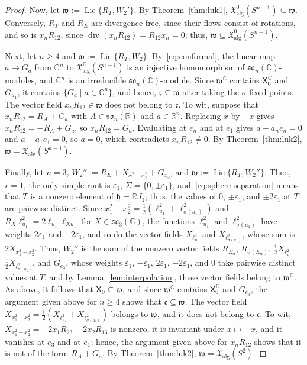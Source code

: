 \documentclass{article}
\newcommand{\R}{\mathbb{R}}
\newcommand{\C}{\mathbb{C}}
\newcommand{\frakh}{\mathfrak{h}}
\newcommand{\frakw}{\mathfrak{w}}
\newcommand{\frakc}{\mathfrak{c}}
\newcommand{\xalg}{\mathfrak X_{\mathrm{alg}}}
\newcommand{\xalgz}{\mathfrak X^{0}_{\mathrm{alg}}}
\newcommand{\sX}{\mathsf{X}}
\theoremstyle{definition}
\theoremstyle{plain}
\begin{document}
\begin{proof}
Now, let $\frakw:=\operatorname{Lie}\{R_T,W_2'\}$.
By Theorem~\ref{thm:luk1}, $\xalgz(S^{n-1})\subseteq\frakw$.
Conversely, $R_T$ and $R_E$ are divergence-free, since their flows consist of rotations, and so is $x_nR_{12}$, since $\operatorname{div}(x_nR_{12})=R_{12}x_n=0$; thus, $\frakw\subseteq\xalgz(S^{n-1})$.

Next, let $n\geq4$ and $\frakw:=\operatorname{Lie}\{R_T,W_2\}$.
By~\eqref{eq:conformal}, the linear map $a\mapsto G_a$ from $\C^n$ to $\xalg^\C(S^{n-1})$ is an injective homomorphism of $\mathfrak{so}_n(\C)$-modules, and $\C^n$ is an irreducible $\mathfrak{so}_n(\C)$-module. Since $\frakw^\C$ contains $\sX_0^\C$ and $G_{u_1}$, it contains $\{G_a\mid a\in\C^n\}$, and hence, $\frakc\subseteq\frakw$ after taking the $\sigma$-fixed points.
The vector field $x_nR_{12}\in\frakw$ does not belong to $\frakc$.
To wit, suppose that $x_nR_{12}=R_A+G_a$ with $A\in\mathfrak{so}_n(\R)$ and $a\in\R^n$.  Replacing $x$ by $-x$ gives $x_nR_{12}=-R_A+G_a$, so $x_nR_{12}=G_a$. Evaluating at $e_n$ and at $e_1$ gives $a-a_ne_n=0$ and $a-a_1e_1=0$, so $a=0$, which contradicts $x_nR_{12}\neq0$.
By Theorem~\ref{thm:luk2}, $\frakw=\xalg(S^{n-1})$.

Finally, let $n=3$, $W_2'':=R_E+X_{x_1^2-x_2^2}+G_{x_3}$, and $\frakw:=\operatorname{Lie}\{R_T,W_2''\}$.
Then, $r=1$, the only simple root is $\varepsilon_1$, $\Sigma=\{0,\pm\varepsilon_1\}$, and~\eqref{eq:sphere-separation} means that $T$ is a nonzero element of $\frakh=\R J_1$; thus, the values of $0$,
  $\pm\varepsilon_1$, and $\pm2\varepsilon_1$ at $T$ are pairwise distinct.
Since $x_1^2-x_2^2=\frac12(\ell_{u_1}^2+\ell_{\sigma(u_1)}^2)$ and $R_X\ell_{u_1}^2=2\ell_{u_1}\ell_{Xu_1}$ for $X\in\mathfrak{so}_3(\C)$, the functions $\ell_{u_1}^2$ and $\ell_{\sigma(u_1)}^2$ have weights $2\varepsilon_1$ and $-2\varepsilon_1$,
    and so do the vector fields $X_{\ell_{u_1}^2}$ and $X_{\ell_{\sigma(u_1)}^2}$, whose sum is $2X_{x_1^2-x_2^2}$.
Thus, $W_2''$ is the sum of the nonzero vector fields $R_{E_\alpha}$, $R_{\sigma(E_\alpha)}$, $\frac12X_{\ell_{u_1}^2}$, $\frac12X_{\ell_{\sigma(u_1)}^2}$, and $G_{e_3}$, whose weights $\varepsilon_1$, $-\varepsilon_1$, $2\varepsilon_1$, $-2\varepsilon_1$, and $0$ take pairwise distinct values at $T$, and by Lemma~\ref{lem:interpolation}, these vector fields belong to $\frakw^\C$.
As above, it follows that $\sX_0\subseteq\frakw$, and since $\frakw^\C$ contains $\sX_0^\C$ and $G_{e_3}$, the argument given above for $n\geq4$ shows that $\frakc\subseteq\frakw$.
The vector field $X_{x_1^2-x_2^2}=\frac12(X_{\ell_{u_1}^2}+X_{\ell_{\sigma(u_1)}^2})$ belongs to $\frakw$, and it does not belong to $\frakc$.
To wit, $X_{x_1^2-x_2^2}=-2x_1R_{23}-2x_2R_{13}$ is nonzero, it is invariant under $x\mapsto-x$, and it vanishes at $e_3$ and at $e_1$; hence, the argument given above for $x_nR_{12}$ shows that it is not of the form $R_A+G_a$.
By Theorem~\ref{thm:luk2}, $\frakw=\xalg(S^2)$.
\end{proof}
\end{document}
